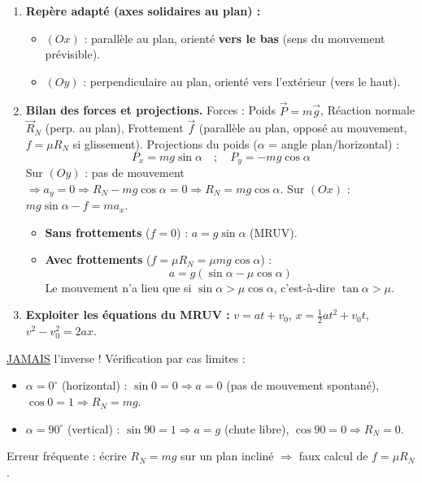 \documentclass[11pt]{article}
\begin{document}
\begin{methode}
\begin{enumerate}
\item \textbf{Repère adapté (axes solidaires au plan) :}
\begin{itemize}
\item $(Ox)$ : parallèle au plan, orienté \textbf{vers le bas} (sens du mouvement prévisible).
\item $(Oy)$ : perpendiculaire au plan, orienté vers l'extérieur (vers le haut).
\end{itemize}
\item \textbf{Bilan des forces et projections.}
Forces : Poids $\vec{P}=m\vec{g}$, Réaction normale $\vec{R}_N$ (perp. au plan), Frottement $\vec{f}$ (parallèle au plan, opposé au mouvement, $f=\mu R_N$ si glissement).
Projections du poids ($\alpha$ = angle plan/horizontal) :
\[ P_x = mg\sin\alpha \quad ; \quad P_y = -mg\cos\alpha \]
Sur $(Oy)$ : pas de mouvement $\Rightarrow a_y=0 \Rightarrow R_N - mg\cos\alpha = 0 \Rightarrow \boxed{R_N=mg\cos\alpha}$.
Sur $(Ox)$ : $mg\sin\alpha - f = ma_x$.
\begin{itemize}
\item \textbf{Sans frottements} ($f=0$) : $\boxed{a=g\sin\alpha}$ (MRUV).
\item \textbf{Avec frottements} ($f=\mu R_N=\mu mg\cos\alpha$) :
\[ a = g(\sin\alpha - \mu\cos\alpha) \]
Le mouvement n'a lieu que si $\sin\alpha > \mu\cos\alpha$, c'est-à-dire $\boxed{\tan\alpha > \mu}$.
\end{itemize}
\item \textbf{Exploiter les équations du MRUV :} $v=at+v_0$, $x=\frac{1}{2}at^2+v_0t$, $v^2-v_0^2=2ax$.
\end{enumerate}
\begin{attention}
\underline{JAMAIS} l'inverse ! Vérification par cas limites :
\begin{itemize}
\item $\alpha=0^{\circ}$ (horizontal) : $\sin 0=0 \Rightarrow a=0$ (pas de mouvement spontané), $\cos 0=1 \Rightarrow R_N=mg$. \checkmark
\item $\alpha=90^{\circ}$ (vertical) : $\sin 90=1 \Rightarrow a=g$ (chute libre), $\cos 90=0 \Rightarrow R_N=0$. \checkmark
\end{itemize}
Erreur fréquente : écrire $R_N=mg$ sur un plan incliné $\Rightarrow$ faux calcul de $f=\mu R_N$.
\end{attention}
\end{methode}
\end{document}
